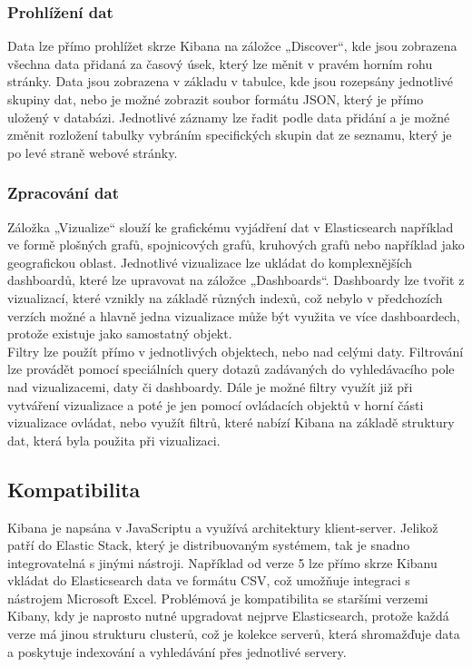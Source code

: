 \documentclass[czech,BP]{thesiskiv}
\begin{document}
 \subsubsection{Prohlížení dat}
 Data lze přímo prohlížet skrze Kibana na záložce „Discover“, kde jsou zobrazena všechna data přidaná za časový úsek, který lze měnit v pravém horním rohu stránky. Data jsou zobrazena v základu v tabulce, kde jsou rozepsány jednotlivé skupiny dat, nebo je možné zobrazit soubor formátu JSON, který je přímo uložený v databázi. Jednotlivé záznamy lze řadit podle data přidání a je možné změnit rozložení tabulky vybráním specifických skupin dat ze seznamu, který je po levé straně webové stránky.
 \subsubsection{Zpracování dat}
 Záložka „Vizualize“ slouží ke grafickému vyjádření dat v Elasticsearch například ve formě plošných grafů, spojnicových grafů, kruhových grafů nebo například jako geografickou oblast. Jednotlivé vizualizace lze ukládat do komplexnějších dashboardů, které lze upravovat na záložce „Dashboards“. Dashboardy lze tvořit z vizualizací, které vznikly na základě různých indexů, což nebylo v předchozích verzích možné a hlavně jedna vizualizace může být využita ve více dashboardech, protože existuje jako samostatný objekt.
 \\
 Filtry lze použít přímo v jednotlivých objektech, nebo nad celými daty. Filtrování lze provádět pomocí speciálních query dotazů zadávaných do vyhledávacího pole nad vizualizacemi, daty či dashboardy. Dále je možné filtry využít již při vytváření vizualizace a poté je jen pomocí ovládacích objektů v horní části vizualizace ovládat, nebo využít filtrů, které nabízí Kibana na základě struktury dat, která byla použita při vizualizaci.\cite{KibanaQueries}
 
 \subsection{Kompatibilita}
	Kibana je napsána v JavaScriptu a využívá architektury klient-server. Jelikož patří do Elastic Stack, který je distribuovaným systémem, tak je snadno integrovatelná s jinými nástroji. Například od verze 5 lze přímo skrze Kibanu vkládat do Elasticsearch data ve formátu CSV, což umožňuje integraci s nástrojem Microsoft Excel. Problémová je kompatibilita se staršími verzemi Kibany, kdy je naprosto nutné upgradovat nejprve Elasticsearch, protože každá verze má jinou strukturu clusterů, což je kolekce serverů, která shromažďuje data a poskytuje indexování a vyhledávání přes jednotlivé servery.
 
\end{document}
